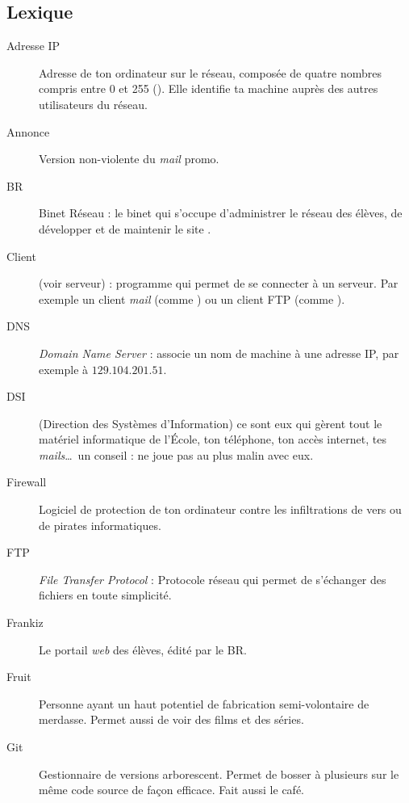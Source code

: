 \subsection{Lexique}


\begin{description}
  \item[Adresse IP] Adresse de ton ordinateur sur le réseau, composée de quatre nombres compris entre 0 et 255  (). Elle identifie ta machine auprès des autres utilisateurs du réseau.
  \item[Annonce] Version non-violente du \emph{mail} promo.
  
  \item[BR] Binet Réseau : le binet qui s'occupe d'administrer le réseau des élèves, de développer et de maintenir le site .

  \item[Client] (voir serveur) : programme qui permet de se connecter à un serveur. Par exemple un client \emph{mail}
	(comme ) ou un client FTP (comme ).
  \item[DNS] \emph{Domain Name Server} : associe un nom de machine à une adresse IP, par exemple  à  $129.104.201.51$.
  \item[DSI] (Direction des Systèmes d'Information) ce sont eux qui gèrent tout le matériel informatique de l'École, ton téléphone, ton accès internet, tes \emph{mails}\ldots\ un conseil : ne joue pas au plus malin avec eux.

  \item[Firewall] Logiciel de protection de ton ordinateur contre les infiltrations de vers ou de pirates informatiques.
  \item[FTP] \emph{File Transfer Protocol} : Protocole réseau qui permet de s'échanger des fichiers en toute simplicité.

  \item[Frankiz] Le portail \emph{web} des élèves, édité par le BR.
  \item[Fruit] Personne ayant un haut potentiel de fabrication semi-volontaire de merdasse. Permet aussi de voir des films et des séries.

  \item[Git] Gestionnaire de versions arborescent. Permet de bosser à plusieurs sur le même code source de façon efficace. Fait aussi le café.
  

\end{description}
